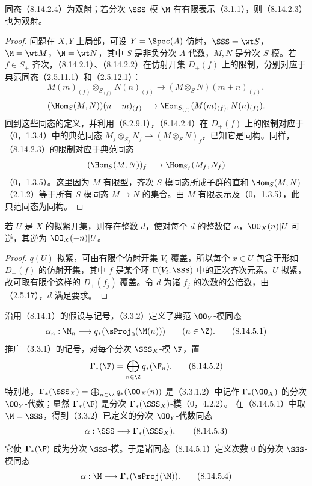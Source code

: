  同态（8.14.2.4）为双射；若分次 $\SSS$-模 $\M$ 有有限表示（3.1.1），则（8.14.2.3）也为双射。
\begin{proof}
问题在 $X,Y$ 上局部，可设 $Y=\Spec(A)$ 仿射，$\SSS=\wt S$，$\M=\wt M$，$\N=\wt N$，其中 $S$ 是非负分次 $A$-代数，$M,N$ 是分次 $S$-模。若 $f\in S_+$ 齐次，（8.14.2.1）、（8.14.2.2）在仿射开集 $D_+(f)$ 上的限制，分别对应于典范同态（2.5.11.1）和（2.5.12.1）：
\[M(m)_{(f)}\otimes_{S_{(f)}}N(n)_{(f)}\longrightarrow(M\otimes_S N)(m+n)_{(f)},\]
\[(\Hom_S(M,N))(n-m)_{(f)}\longrightarrow
\Hom_{S_{(f)}}(M(m)_{(f)},N(n)_{(f)}).\]
回到这些同态的定义，并利用（8.2.9.1），（8.14.2.4）在 $D_+(f)$ 上的限制对应于（0，1.3.4）中的典范同态 $M_f\otimes_{S_f}N_f\to(M\otimes_S N)_f$，已知它是同构。同样，（8.14.2.3）的限制对应于典范同态
\[(\Hom_S(M,N))_f\longrightarrow\Hom_{S_f}(M_f,N_f)\]
（0，1.3.5）。这里因为 $M$ 有限型，齐次 $S$-模同态所成子群的直和 $\Hom_S(M,N)$（2.1.2）等于所有 $S$-模同态 $M\to N$ 的集合。由 $M$ 有限表示及（0，1.3.5），此典范同态为同构。
\end{proof}

 若 $U$ 是 $X$ 的拟紧开集，则存在整数 $d$，使对每个 $d$ 的整数倍 $n$，$\OO_X(n)|U$ 可逆，其逆为 $\OO_X(-n)|U$。
\begin{proof}
$q(U)$ 拟紧，可由有限个仿射开集 $V_i$ 覆盖，所以每个 $x\in U$ 包含于形如 $D_+(f)$ 的仿射开集，其中 $f$ 是某个环 $\Gamma(V_i,\SSS)$ 中的正次齐次元素。$U$ 拟紧，故可取有限个这样的 $D_+(f_j)$ 覆盖。令 $d$ 为诸 $f_j$ 的次数的公倍数，由（2.5.17），$d$ 满足要求。
\end{proof}

 沿用（8.14.1）的假设与记号，（3.3.2）定义了典范 $\OO_Y$-模同态
\begin{equation}\alpha_n:\M_n\longrightarrow q_*(\sProj_0(\M(n)))\qquad(n\in\Z).\tag{8.14.5.1}\end{equation}
推广（3.3.1）的记号，对每个分次 $\SSS_X$-模 $\F$，置
\begin{equation}\boldsymbol\Gamma_*(\F)=\bigoplus_{n\in\Z}q_*(\F_n).\tag{8.14.5.2}\end{equation}
特别地，$\boldsymbol\Gamma_*(\SSS_X)=\bigoplus_{n\in\Z}q_*(\OO_X(n))$ 是（3.3.1.2）中记作 $\Gamma_*(\OO_X)$ 的分次 $\OO_Y$-代数；显然 $\boldsymbol\Gamma_*(\F)$ 是分次 $\boldsymbol\Gamma_*(\SSS_X)$-模（0，4.2.2）。
在（8.14.5.1）中取 $\M=\SSS$，得到（3.3.2）已定义的分次 $\OO_Y$-代数同态
\begin{equation}\alpha:\SSS\longrightarrow\boldsymbol\Gamma_*(\SSS_X),\tag{8.14.5.3}\end{equation}
它使 $\boldsymbol\Gamma_*(\F)$ 成为分次 $\SSS$-模。于是诸同态（8.14.5.1）定义次数 $0$ 的分次 $\SSS$-模同态
\begin{equation}\alpha:\M\longrightarrow\boldsymbol\Gamma_*(\sProj(\M)).\tag{8.14.5.4}\end{equation}


